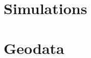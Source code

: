 \documentclass[12pt,reqno]{amsart} %
\begin{document}
\appendix

\begin{refsection}
\section{Simulations} %
\label{sec:simulations}

\section{Geodata} %
\label{sec:geodata}
\textcite{jordahlGeoPandasPythonTools2014}


\printbibliography
\end{refsection}


\medskip
\end{document}
